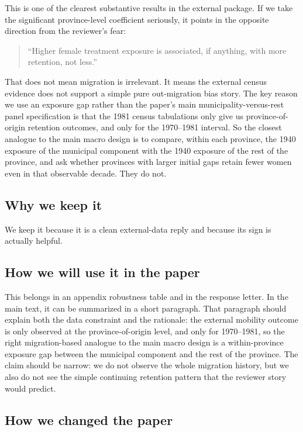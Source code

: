 \documentclass[11pt]{article}
\begin{document}
This is one of the clearest substantive results in the external package. If we take the significant province-level coefficient seriously, it points in the opposite direction from the reviewer's fear:

\begin{quote}
``Higher female treatment exposure is associated, if anything, with more retention, not less.''
\end{quote}

That does not mean migration is irrelevant. It means the external census evidence does not support a simple pure out-migration bias story. The key reason we use an exposure gap rather than the paper's main municipality-versus-rest panel specification is that the 1981 census tabulations only give us province-of-origin retention outcomes, and only for the 1970--1981 interval. So the closest analogue to the main macro design is to compare, within each province, the 1940 exposure of the municipal component with the 1940 exposure of the rest of the province, and ask whether provinces with larger initial gaps retain fewer women even in that observable decade. They do not.

\subsection*{Why we keep it}

We keep it because it is a clean external-data reply and because its sign is actually helpful.

\subsection*{How we will use it in the paper}

This belongs in an appendix robustness table and in the response letter. In the main text, it can be summarized in a short paragraph. That paragraph should explain both the data constraint and the rationale: the external mobility outcome is only observed at the province-of-origin level, and only for 1970--1981, so the right migration-based analogue to the main macro design is a within-province exposure gap between the municipal component and the rest of the province. The claim should be narrow: we do not observe the whole migration history, but we also do not see the simple continuing retention pattern that the reviewer story would predict.

\subsection*{How we changed the paper}
\end{document}
